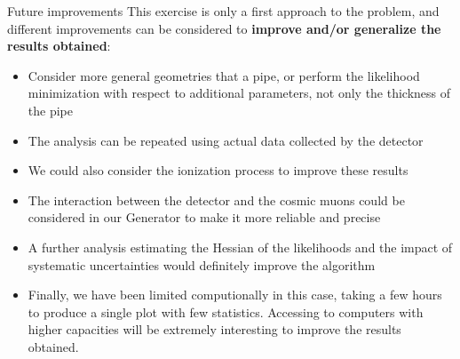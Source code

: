 \documentclass[8 pt]{beamer}
\newcommand{\backupend}{
   \setcounter{framenumber}{\value{finalframe}}
}
\begin{document}
\begin{frame}{Future improvements}
\justifying
This exercise is only a first approach to the problem, and different improvements can be considered to \textbf{improve and/or generalize the results obtained}:
\begin{itemize}
\justifying
\item Consider more general geometries that a pipe, or perform the likelihood minimization with respect to additional parameters, not only the thickness of the pipe
\item The analysis can be repeated using actual data collected by the detector
\item We could also consider the ionization process to improve these results
\item The interaction between the detector and the cosmic muons could be considered in our Generator to make it more reliable and precise
\item A further analysis estimating the Hessian of the likelihoods and the impact of systematic uncertainties would definitely improve the algorithm
\item Finally, we have been limited computionally in this case, taking a few hours to produce a single plot with few statistics. Accessing to computers with higher capacities will be extremely interesting to improve the results obtained.
\end{itemize}
\end{frame}

\backupend


 
\end{document}
